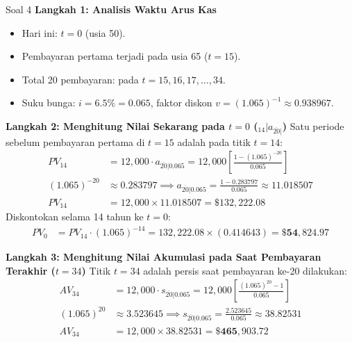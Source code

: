 \documentclass[11pt,a4paper]{article}
\begin{document}
\begin{solutionbox}{Soal 4}
\textbf{Langkah 1: Analisis Waktu Arus Kas}
\begin{itemize}
    \item Hari ini: $t = 0$ (usia 50).
    \item Pembayaran pertama terjadi pada usia 65 ($t = 15$).
    \item Total 20 pembayaran: pada $t = 15, 16, 17, \dots, 34$.
    \item Suku bunga: $i = 6.5\% = 0.065$, faktor diskon $v = (1.065)^{-1} \approx 0.938967$.
\end{itemize}

\textbf{Langkah 2: Menghitung Nilai Sekarang pada $t = 0$ (${}_{14}| a_{\overline{20}|}$)}
Satu periode sebelum pembayaran pertama di $t=15$ adalah pada titik $t = 14$:
\begin{align*}
    PV_{14} &= 12{,}000 \cdot a_{\overline{20}|0.065} = 12{,}000 \left[\frac{1 - (1.065)^{-20}}{0.065}\right] \\[0.4em]
    (1.065)^{-20} &\approx 0.283797 \implies a_{\overline{20}|0.065} = \frac{1 - 0.283797}{0.065} \approx 11.018507 \\[0.4em]
    PV_{14} &= 12{,}000 \times 11.018507 = \$132{,}222.08
\end{align*}
Diskontokan selama 14 tahun ke $t = 0$:
\begin{align*}
    PV_0 &= PV_{14} \cdot (1.065)^{-14} = 132{,}222.08 \times (0.414643) = \mathbf{\$54{,}824.97}
\end{align*}

\textbf{Langkah 3: Menghitung Nilai Akumulasi pada Saat Pembayaran Terakhir ($t = 34$)}
Titik $t = 34$ adalah persis saat pembayaran ke-20 dilakukan:
\begin{align*}
    AV_{34} &= 12{,}000 \cdot s_{\overline{20}|0.065} = 12{,}000 \left[\frac{(1.065)^{20} - 1}{0.065}\right] \\[0.4em]
    (1.065)^{20} &\approx 3.523645 \implies s_{\overline{20}|0.065} = \frac{2.523645}{0.065} \approx 38.82531 \\[0.4em]
    AV_{34} &= 12{,}000 \times 38.82531 = \mathbf{\$465{,}903.72}
\end{align*}
\end{solutionbox}

\vspace{1.5em}
\end{document}
